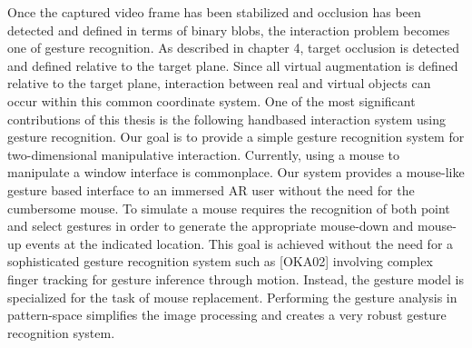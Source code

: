 Once the captured video frame has been stabilized and occlusion has been detected and defined in terms of binary blobs, the interaction problem becomes one of gesture recognition. As described in chapter 4, target occlusion is detected and defined relative to the target plane. Since all virtual augmentation is defined relative to the target plane, interaction between real and virtual objects can occur within this common coordinate system. One of the most significant contributions of this thesis is the following handbased interaction system using gesture recognition. Our goal is to provide a simple gesture recognition system for two-dimensional manipulative interaction. Currently, using a mouse to manipulate a window interface is commonplace. Our system provides a mouse-like gesture based interface to an immersed AR user without the need for the cumbersome mouse. To simulate a mouse requires the recognition of both point and select gestures in order to generate the appropriate mouse-down and mouse-up events at the indicated location. This goal is achieved without the need for a sophisticated gesture recognition system such as [OKA02] involving complex finger tracking for gesture inference through motion. Instead, the gesture model is specialized for the task of mouse replacement. Performing the gesture analysis in pattern-space simplifies the image processing and creates a very robust gesture recognition system.

